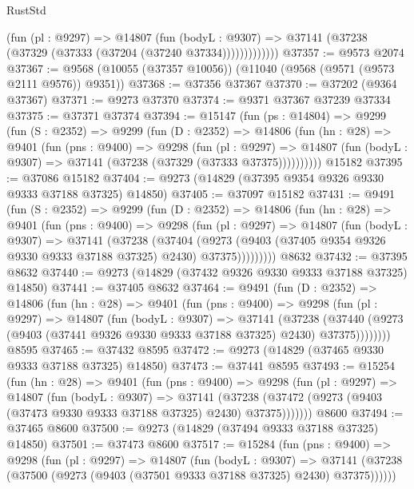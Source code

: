 \begin{lexlean}{RustStd}
\begin{coremodule}
{\begin{coremodule}
{{{{{{{{{{{{{{{{{{{{{{{{{{{{{{{{{{{{{{{{{{{{{{{{{{{{{{{                (fun (pl : @9297) =>
                @14807
                  (fun (bodyL : @9307) =>
                  @37141 (@37238 (@37329 (@37333 (@37204 (@37240 @37334)))))))))))))
@37357 := @9573 @2074
@37367 := @9568 (@10055 (@37357 @10056)) (@11040 (@9568 (@9571 (@9573 @2111 @9576)) @9351))
@37368 := @37356 @37367
@37370 := @37202 (@9364 @37367)
@37371 := @9273 @37370
@37374 := @9371 @37367 @37239 @37334
@37375 := @37371 @37374
@37394 := @15147
    (fun (ps : @14804) =>
    @9299
      (fun (S : @2352) =>
      @9299
        (fun (D : @2352) =>
        @14806
          (fun (hn : @28) =>
          @9401
            (fun (pns : @9400) =>
            @9298
              (fun (pl : @9297) =>
              @14807 (fun (bodyL : @9307) => @37141 (@37238 (@37329 (@37333 @37375))))))))))
    @15182
@37395 := @37086 @15182
@37404 := @9273 (@14829 (@37395 @9354 @9326 @9330 @9333 @37188 @37325) @14850)
@37405 := @37097 @15182
@37431 := @9491
    (fun (S : @2352) =>
    @9299
      (fun (D : @2352) =>
      @14806
        (fun (hn : @28) =>
        @9401
          (fun (pns : @9400) =>
          @9298
            (fun (pl : @9297) =>
            @14807
              (fun (bodyL : @9307) =>
              @37141
                (@37238
                  (@37404
                    (@9273
                      (@9403 (@37405 @9354 @9326 @9330 @9333 @37188 @37325) @2430)
                      @37375)))))))))
    @8632
@37432 := @37395 @8632
@37440 := @9273 (@14829 (@37432 @9326 @9330 @9333 @37188 @37325) @14850)
@37441 := @37405 @8632
@37464 := @9491
    (fun (D : @2352) =>
    @14806
      (fun (hn : @28) =>
      @9401
        (fun (pns : @9400) =>
        @9298
          (fun (pl : @9297) =>
          @14807
            (fun (bodyL : @9307) =>
            @37141
              (@37238
                (@37440 (@9273 (@9403 (@37441 @9326 @9330 @9333 @37188 @37325) @2430) @37375))))))))
    @8595
@37465 := @37432 @8595
@37472 := @9273 (@14829 (@37465 @9330 @9333 @37188 @37325) @14850)
@37473 := @37441 @8595
@37493 := @15254
    (fun (hn : @28) =>
    @9401
      (fun (pns : @9400) =>
      @9298
        (fun (pl : @9297) =>
        @14807
          (fun (bodyL : @9307) =>
          @37141
            (@37238 (@37472 (@9273 (@9403 (@37473 @9330 @9333 @37188 @37325) @2430) @37375)))))))
    @8600
@37494 := @37465 @8600
@37500 := @9273 (@14829 (@37494 @9333 @37188 @37325) @14850)
@37501 := @37473 @8600
@37517 := @15284
    (fun (pns : @9400) =>
    @9298
      (fun (pl : @9297) =>
      @14807
        (fun (bodyL : @9307) =>
        @37141 (@37238 (@37500 (@9273 (@9403 (@37501 @9333 @37188 @37325) @2430) @37375))))))
}}}}}}}}}}}}}}}}}}}}}}}}}}}}}}}}}}}}}}}}}}}}}}}}}}}}}}}
\end{coremodule}}
\end{coremodule}
\end{lexlean}

